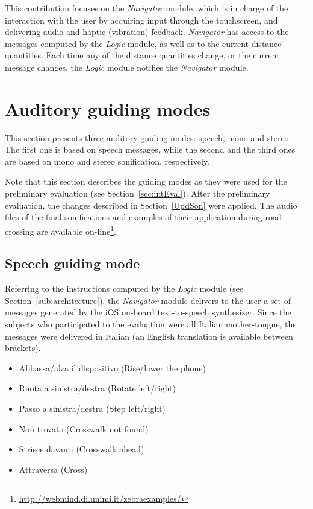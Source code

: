 \documentclass{article}
\newcommand{\logic}{\emph{Logic}}
\newcommand{\navigator}{\emph{Navigator}}
\begin{document}
This contribution focuses on the \navigator{} module, which is in charge of the interaction with the user by acquiring input through the touchscreen, and delivering audio and haptic (vibration) feedback.
\navigator{} has access to the messages computed by the \logic{} module, as well as to the current distance quantities.
Each time any of the distance quantities change, or the current message changes, the \logic{} module notifies the \navigator{} module.



\section{Auditory guiding modes}
\label{sec:guidingModes}
This section presents three auditory guiding modes: speech, mono and stereo.
The first one is based on speech messages, while the second and the third ones are based on mono and stereo sonification, respectively.

Note that this section describes the guiding modes as they were used for the preliminary evaluation (see Section~\ref{sec:intEval}).
After the preliminary evaluation, the changes described in Section~\ref{UpdSon} were applied. The audio files of the final sonifications and examples of their application during road crossing are available on-line\footnote{\url{http://webmind.di.unimi.it/zebraexamples/}}.

\subsection{Speech guiding mode}
\label{SpeechMessages}
Referring to the instructions computed by the \logic{} module (see Section~\ref{sub:architecture}), the \navigator{} module delivers to the user a set of messages generated by the iOS on-board text-to-speech synthesizer.
Since the subjects who participated to the evaluation were all Italian mother-tongue, the messages were delivered in Italian (an English translation is available between brackets).

\begin{itemize}
\item Abbassa/alza il dispositivo (Rise/lower the phone)
\item Ruota a sinistra/destra (Rotate left/right)
\item Passo a sinistra/destra (Step left/right)
\item Non trovato (Crosswalk not found)
\item Strisce davanti (Crosswalk ahead)
\item Attraversa (Cross)
\end{itemize}
\end{document}
